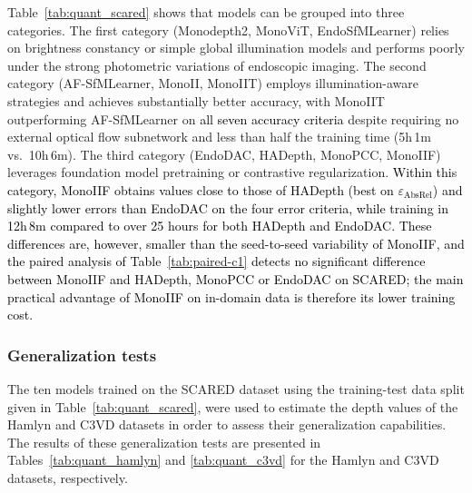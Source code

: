 \documentclass[a4paper,fleqn]{cas-dc}
\begin{document}


Table~\ref{tab:quant_scared} shows that models can be grouped into three categories. The first category (Monodepth2, MonoViT, EndoSfMLearner) relies on brightness constancy or simple global illumination models and performs poorly under the strong photometric variations of endoscopic imaging. The second category (AF-SfMLearner, MonoII, MonoIIT) employs illumination-aware strategies and achieves substantially better accuracy, with MonoIIT outperforming AF-SfMLearner on \textcolor{black}{all seven accuracy criteria} despite requiring no external optical flow subnetwork and less than half the training time (5h\,1m vs.\ 10h\,6m). The third category (EndoDAC, HADepth, MonoPCC, MonoIIF) leverages foundation model pretraining or contrastive regularization. \textcolor{black}{ Within this category, MonoIIF obtains values close to those of HADepth (best on $\varepsilon_\text{AbsRel}$) and slightly lower errors than EndoDAC on the four error criteria, while training in 12h\,8m compared to over 25 hours for both HADepth and EndoDAC. These differences are, however, smaller than the seed-to-seed variability of MonoIIF, and the paired analysis of Table~\ref{tab:paired-c1} \textcolor{black}{detects no significant difference between MonoIIF and HADepth, MonoPCC or EndoDAC on SCARED;} the main practical advantage of MonoIIF on in-domain data is therefore its lower training cost.}

%
\subsubsection{Generalization tests}
%

The ten models trained on the SCARED dataset using the training-test data split given in  Table~\ref{tab:quant_scared}, were used to estimate the depth values of the Hamlyn and C3VD datasets in order to assess their generalization capabilities. The results of these generalization tests are presented in Tables~\ref{tab:quant_hamlyn} and \ref{tab:quant_c3vd} for the Hamlyn and C3VD datasets, respectively.
\end{document}
